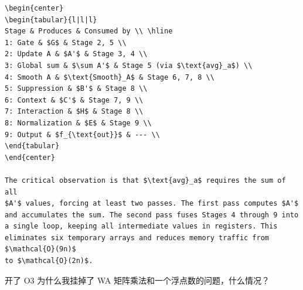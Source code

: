 \documentclass[11pt, a4paper]{article}
\begin{document}
\begin{aibox}
\begin{tcolorbox}[colback=white,colframe=gray!50!white,boxrule=0.5pt,arc=2pt,left=5pt,right=5pt,top=5pt,bottom=5pt]
\begin{verbatim}
\begin{center}
\begin{tabular}{l|l|l}
Stage & Produces & Consumed by \\ \hline
1: Gate & $G$ & Stage 2, 5 \\
2: Update A & $A'$ & Stage 3, 4 \\
3: Global sum & $\sum A'$ & Stage 5 (via $\text{avg}_a$) \\
4: Smooth A & $\text{Smooth}_A$ & Stage 6, 7, 8 \\
5: Suppression & $B'$ & Stage 8 \\
6: Context & $C'$ & Stage 7, 9 \\
7: Interaction & $H$ & Stage 8 \\
8: Normalization & $E$ & Stage 9 \\
9: Output & $f_{\text{out}}$ & --- \\
\end{tabular}
\end{center}

The critical observation is that $\text{avg}_a$ requires the sum of all
$A'$ values, forcing at least two passes. The first pass computes $A'$
and accumulates the sum. The second pass fuses Stages 4 through 9 into
a single loop, keeping all intermediate values in registers. This
eliminates six temporary arrays and reduces memory traffic from $\mathcal{O}(9n)$
to $\mathcal{O}(2n)$.
\end{verbatim}
\end{tcolorbox}
\end{aibox}

\vspace{1.5em}

\begin{userbox}
开了 O3 为什么我挂掉了 WA 矩阵乘法和一个浮点数的问题，什么情况？
\end{userbox}
\end{document}
